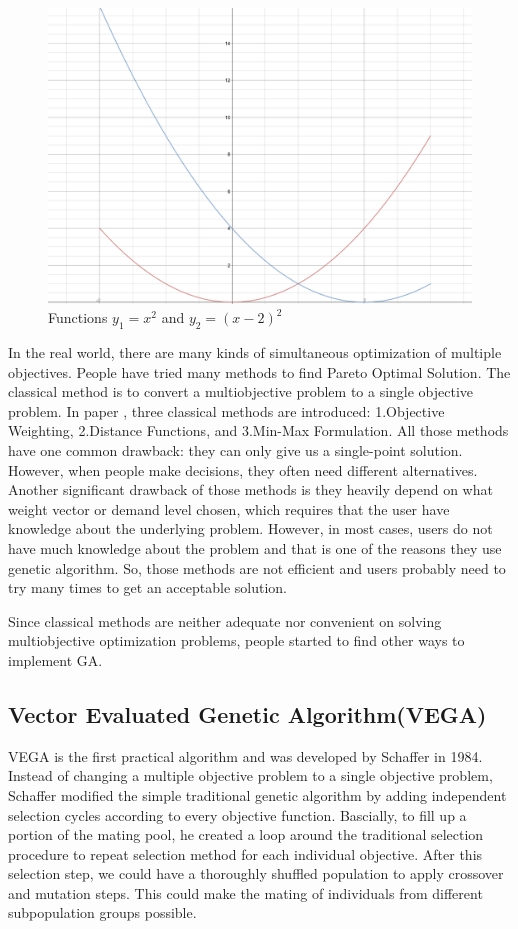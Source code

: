 \begin{figure}[htp] 
\centering
\includegraphics[scale=.2]{images/Figure_1.png}
\caption{Functions \(y_{1}=x^2\) and \(y_{2}=(x-2)^2\)}
\label{fig:two_functions}
\end{figure}

In the real world, there are many kinds of simultaneous optimization of multiple objectives. People have tried many methods to find Pareto Optimal Solution. The classical method is to convert a multiobjective problem to a single objective problem. In paper \cite{NSGA_1994}, three classical methods are introduced: 1.Objective Weighting, 2.Distance Functions, and 3.Min-Max Formulation. All those methods have one common drawback: they can only give us a single-point solution. However, when people make decisions, they often need different alternatives. Another significant drawback of those methods is they heavily depend on what weight vector or demand level chosen, which requires that the user have knowledge about the underlying problem. However, in most cases, users do not have much knowledge about the problem and that is one of the reasons they use genetic algorithm. So, those methods are not efficient and users probably need to try many times to get an acceptable solution.

Since classical methods are neither adequate nor convenient on solving multiobjective optimization problems, people started to find other ways to implement GA.

\subsection{Vector Evaluated Genetic Algorithm(VEGA)}
VEGA is the first practical algorithm and was developed by Schaffer in 1984\cite{Schaffer_1984_Some}. Instead of changing a multiple objective problem to a single objective problem, Schaffer modified the simple traditional genetic algorithm by adding independent selection cycles according to every objective function\cite{Schaffer_1984_Some}. Bascially, to fill up a portion of the mating pool, he created a loop around the traditional selection procedure to repeat selection method for each individual objective. After this selection step, we could have a thoroughly shuffled population to apply crossover and mutation steps. This could make the mating of individuals from different subpopulation groups possible.

